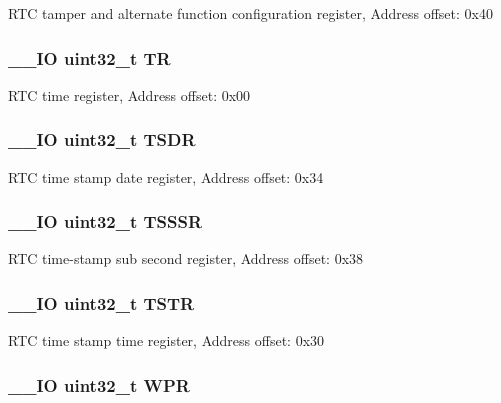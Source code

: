 R\-T\-C tamper and alternate function configuration register, Address offset\-: 0x40 \hypertarget{struct_r_t_c___type_def_a63d179b7a36a715dce7203858d3be132}{
\subsubsection[{T\-R}]{\setlength{\rightskip}{0pt plus 5cm}\-\_\-\-\_\-\-I\-O uint32\-\_\-t T\-R}}\label{struct_r_t_c___type_def_a63d179b7a36a715dce7203858d3be132}
R\-T\-C time register, Address offset\-: 0x00 \hypertarget{struct_r_t_c___type_def_abeb6fb580a8fd128182aa9ba2738ac2c}{
\subsubsection[{T\-S\-D\-R}]{\setlength{\rightskip}{0pt plus 5cm}\-\_\-\-\_\-\-I\-O uint32\-\_\-t T\-S\-D\-R}}\label{struct_r_t_c___type_def_abeb6fb580a8fd128182aa9ba2738ac2c}
R\-T\-C time stamp date register, Address offset\-: 0x34 \hypertarget{struct_r_t_c___type_def_a1d6c2bc4c067d6a64ef30d16a5925796}{
\subsubsection[{T\-S\-S\-S\-R}]{\setlength{\rightskip}{0pt plus 5cm}\-\_\-\-\_\-\-I\-O uint32\-\_\-t T\-S\-S\-S\-R}}\label{struct_r_t_c___type_def_a1d6c2bc4c067d6a64ef30d16a5925796}
R\-T\-C time-\/stamp sub second register, Address offset\-: 0x38 \hypertarget{struct_r_t_c___type_def_a042059c8b4168681d6aecf30211dd7b8}{
\subsubsection[{T\-S\-T\-R}]{\setlength{\rightskip}{0pt plus 5cm}\-\_\-\-\_\-\-I\-O uint32\-\_\-t T\-S\-T\-R}}\label{struct_r_t_c___type_def_a042059c8b4168681d6aecf30211dd7b8}
R\-T\-C time stamp time register, Address offset\-: 0x30 \hypertarget{struct_r_t_c___type_def_a6204786b050eb135fabb15784698e86e}{
\subsubsection[{W\-P\-R}]{\setlength{\rightskip}{0pt plus 5cm}\-\_\-\-\_\-\-I\-O uint32\-\_\-t W\-P\-R}}\label{struct_r_t_c___type_def_a6204786b050eb135fabb15784698e86e}
